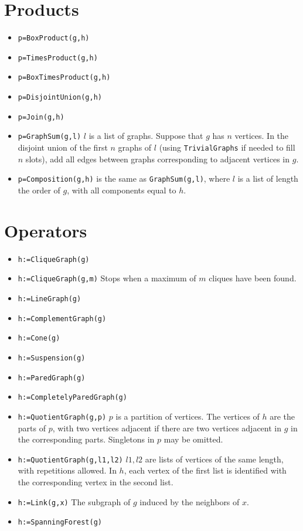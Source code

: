 \documentclass[11pt]{article}
\begin{document}
\begin{multicols}{3}
\section{Products}
\label{sec:org6bf0823}
\begin{itemize}
\item \texttt{p=BoxProduct(g,h)}
\item \texttt{p=TimesProduct(g,h)}
\item \texttt{p=BoxTimesProduct(g,h)}
\item \texttt{p=DisjointUnion(g,h)}
\item \texttt{p=Join(g,h)}
\item \texttt{p=GraphSum(g,l)} \(l\) is a list of graphs. Suppose that \(g\) has
\(n\) vertices. In the disjoint union of the first \(n\) graphs of
\(l\) (using \texttt{TrivialGraphs} if needed to fill \(n\) slots), add all
edges between graphs corresponding to adjacent vertices in \(g\).
\item \texttt{p=Composition(g,h)} is the same as \texttt{GraphSum(g,l)}, where \(l\) is
a list of length the order of \(g\), with all components equal to
\(h\).
\end{itemize}

\section{Operators}
\label{sec:orgd17ee5d}

\begin{itemize}
\item \texttt{h:=CliqueGraph(g)}
\item \texttt{h:=CliqueGraph(g,m)} Stops when a maximum of
\(m\) cliques have been found.
\item \texttt{h:=LineGraph(g)}
\item \texttt{h:=ComplementGraph(g)}
\item \texttt{h:=Cone(g)}
\item \texttt{h:=Suspension(g)}
\item \texttt{h:=ParedGraph(g)}
\item \texttt{h:=CompletelyParedGraph(g)}
\item \texttt{h:=QuotientGraph(g,p)} \(p\) is a partition of vertices. The
vertices of \(h\) are the parts of \(p\), with two vertices adjacent
if there are two vertices adjacent in \(g\) in the corresponding
parts. Singletons in \(p\) may be omitted.
\item \texttt{h:=QuotientGraph(g,l1,l2)} \(l1,l2\) are lists of vertices of the
same length, with repetitions allowed. In \(h\), each vertex of the
first list is identified with the corresponding vertex in the second
list.
\item \texttt{h:=Link(g,x)} The subgraph of \(g\) induced by the neighbors of
\(x\).
\item \texttt{h:=SpanningForest(g)}
\end{itemize}


\end{multicols}
\end{document}
